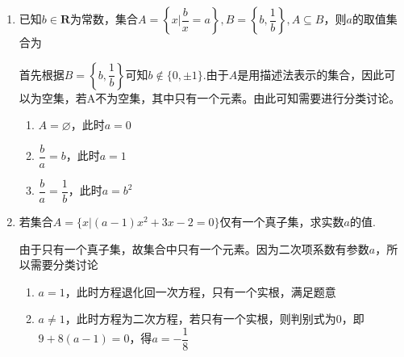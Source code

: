 \begin{enumerate}
    \item 已知$b \in \mathbf{R}$为常数，集合$A = \left\{x | \dfrac{b}{x} = a\right\}, B = \left \{b, \dfrac{1}{b} \right\}, A \subseteq B$，则$a$的取值集合为
    \begin{jieda}
        首先根据$B = \left \{b, \dfrac{1}{b} \right\}$可知$b \notin \{0, \pm 1\}$.由于$A$是用描述法表示的集合，因此可以为空集，若A不为空集，其中只有一个元素。由此可知需要进行分类讨论。
        \begin{enumerate}
            \item $A = \varnothing$，此时$a = 0$
            \item $\dfrac{b}{a} = b$，此时$a = 1$
            \item $\dfrac{b}{a} = \dfrac{1}{b}$，此时$a = b^2$
        \end{enumerate}
    \end{jieda}
    \item 若集合$A = \{x | (a-1)x^2+3x-2 = 0\}$仅有一个真子集，求实数$a$的值.
    \begin{jieda}
        由于只有一个真子集，故集合中只有一个元素。因为二次项系数有参数$a$，所以需要分类讨论
        \begin{enumerate}
            \item $a = 1$，此时方程退化回一次方程，只有一个实根，满足题意  
            \item $a \neq 1$，此时方程为二次方程，若只有一个实根，则判别式为0，即$9 + 8(a-1) = 0$，得$a = -\dfrac{1}{8}$
        \end{enumerate}
    \end{jieda}
\end{enumerate}
